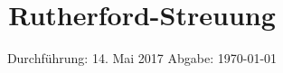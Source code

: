 
\subject{V16}
\title{Rutherford-Streuung}
\date{
  Durchführung: 14. Mai 2017
  \hspace{3em}
  Abgabe: \today
}



\maketitle
\newpage
\mbox{}
\newpage
\thispagestyle{empty}
\tableofcontents
\newpage






\nocite{numpy}
\nocite{matplotlib}
\nocite{uncertainties}
\printbibliography


